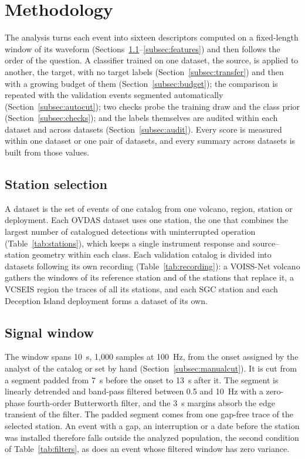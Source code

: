 \documentclass[pdflatex,sn-mathphys-num]{sn-jnl}
\begin{document}
\section{Methodology}\label{sec:methods}

The analysis turns each event into sixteen descriptors computed on a
fixed-length window of its waveform
(Sections~\ref{subsec:stationselection}--\ref{subsec:features}) and then
follows the order of the question. A classifier trained on one dataset, the
source, is applied to another, the target, with no target labels
(Section~\ref{subsec:transfer}) and then with a growing budget of them
(Section~\ref{subsec:budget}); the comparison is repeated with the validation
events segmented automatically (Section~\ref{subsec:autocut}); two checks
probe the training draw and the class prior (Section~\ref{subsec:checks});
and the labels themselves are audited within each dataset and across
datasets (Section~\ref{subsec:audit}). Every score is measured within one
dataset or one pair of datasets, and every summary across datasets is built
from those values.

\subsection{Station selection}\label{subsec:stationselection}

A dataset is the set of events of one catalog from one volcano, region,
station or deployment. Each OVDAS dataset uses one station, the one that combines the largest number
of catalogued detections with uninterrupted operation
(Table~\ref{tab:stations}), which keeps a single instrument response and
source--station geometry within each class. Each validation catalog is
divided into datasets following its own recording (Table~\ref{tab:recording}):
a VOISS-Net volcano gathers the windows of its reference station and of the
stations that replace it, a VCSEIS region the traces of all its stations, and
each SGC station and each Deception Island deployment forms a dataset of its
own.

\subsection{Signal window}\label{subsec:conditioning}

The window spans 10~s, 1{,}000 samples at 100~Hz, from the onset assigned
by the analyst of the catalog or set by hand
(Section~\ref{subsec:manualcut}). It is cut from a segment padded from 7~s before the onset to 13~s after
it. The segment is linearly detrended and band-pass filtered between 0.5 and
10~Hz with a zero-phase fourth-order Butterworth filter, and the 3~s margins
absorb the edge transient of the filter. The padded segment comes from one
gap-free trace of the selected station. An event with a gap, an interruption
or a date before the station was installed therefore falls outside the
analyzed population, the second condition of Table~\ref{tab:filters}, as
does an event whose filtered window has zero variance.
\end{document}
